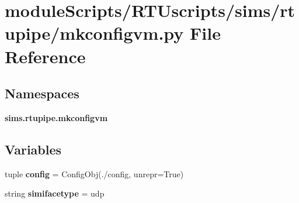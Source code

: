 \section{module\+Scripts/\+R\+T\+Uscripts/sims/rtupipe/mkconfigvm.py File Reference}
\label{rtupipe_2mkconfigvm_8py}
\subsection*{Namespaces}
\begin{DoxyCompactItemize}
\item 
 {\bf sims.\+rtupipe.\+mkconfigvm}
\end{DoxyCompactItemize}
\subsection*{Variables}
\begin{DoxyCompactItemize}
\item 
tuple {\bf config} = Config\+Obj(\textquotesingle{}./config\textquotesingle{}, unrepr=True)
\item 
string {\bf simifacetype} = \textquotesingle{}udp\textquotesingle{}
\end{DoxyCompactItemize}

